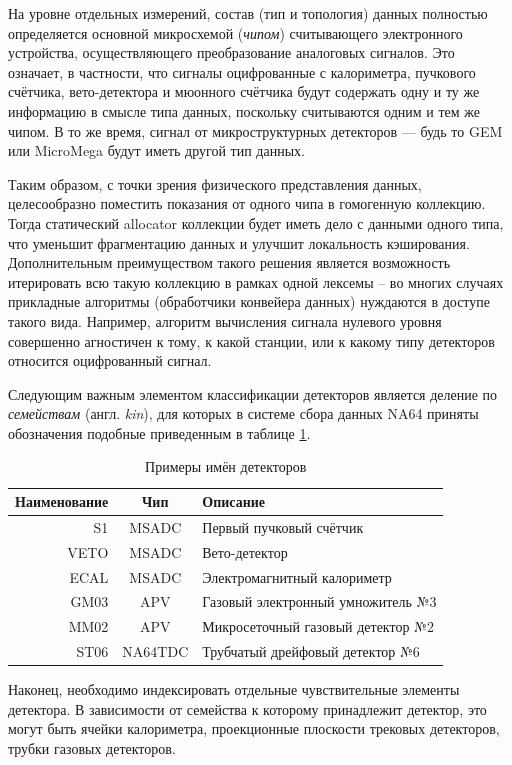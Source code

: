 На уровне отдельных измерений, состав (тип и топология)
данных полностью определяется основной микросхемой (\emph{чипом})
считывающего электронного устройства, осуществляющего
преобразование аналоговых сигналов.
Это означает, в частности, что сигналы оцифрованные с калориметра,
пучкового счётчика, вето-детектора и мюонного счётчика будут
содержать одну и ту же информацию в смысле типа данных, поскольку
считываются одним и тем же чипом. В то же
время, сигнал от микроструктурных детекторов --- будь
то GEM или MicroMega будут иметь другой тип данных.

Таким образом, с точки зрения физического представления данных,
целесообразно поместить показания от одного чипа в
гомогенную коллекцию. Тогда статический
\gls{allocator} коллекции будет иметь дело
с данными одного типа, что уменьшит фрагментацию данных и
улучшит локальность кэширования. Дополнительным преимуществом
такого решения является возможность итерировать всю такую коллекцию
в рамках одной лексемы -- во многих случаях прикладные алгоритмы
(обработчики конвейера данных) нуждаются в доступе такого вида.
Например, алгоритм вычисления сигнала нулевого уровня
совершенно агностичен к тому, к какой станции,
или к какому типу детекторов относится оцифрованный сигнал.

Следующим важным элементом классификации детекторов является деление
по \emph{семействам} (англ. \emph{kin}), для которых в системе
сбора данных NA64 приняты обозначения подобные приведенным в
таблице \ref{tab:detector-names-examples}.

\begin{table}[ht]
\centering
\begin{tabular}{r|cl}
Наименование & Чип     & Описание \\ \hline
          S1 & MSADC   & Первый пучковый счётчик \\
        VETO & MSADC   & Вето-детектор \\
        ECAL & MSADC   & Электромагнитный калориметр \\
        GM03 & APV     & Газовый электронный умножитель №3 \\
        MM02 & APV     & Микросеточный газовый детектор №2  \\
        ST06 & NA64TDC & Трубчатый дрейфовый детектор №6
\end{tabular}
\caption{Примеры имён детекторов}
\label{tab:detector-names-examples}
\end{table}

Наконец, необходимо индексировать отдельные чувствительные
элементы детектора. В зависимости от семейства к которому принадлежит
детектор, это могут быть ячейки калориметра, проекционные
плоскости трековых детекторов, трубки газовых детекторов.

